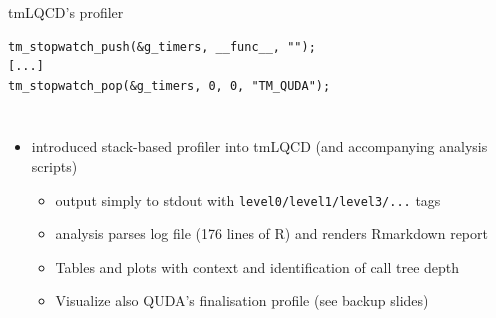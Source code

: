 \documentclass[xcolor={dvipsnames,table}]{beamer}
\begin{document}
\begin{frame}[fragile]{tmLQCD's profiler}
      \begin{verbatim}
tm_stopwatch_push(&g_timers, __func__, "");
[...]
tm_stopwatch_pop(&g_timers, 0, 0, "TM_QUDA");
      \end{verbatim}
  \begin{columns}
      \begin{itemize}
        \item introduced stack-based profiler into tmLQCD (and accompanying analysis scripts)
        \begin{itemize}
          \item output simply to stdout with \texttt{level0/level1/level3/...} tags
          \vspace{0.2cm}
          \item analysis parses log file (176 lines of R) and renders Rmarkdown report
          \vspace{0.2cm}
          \item Tables and plots with context and identification of call tree depth
          \vspace{0.2cm}
          \item Visualize also QUDA's finalisation profile (see backup slides) 


\end{itemize}
\end{itemize}
\end{columns}
\end{frame}
\end{document}
